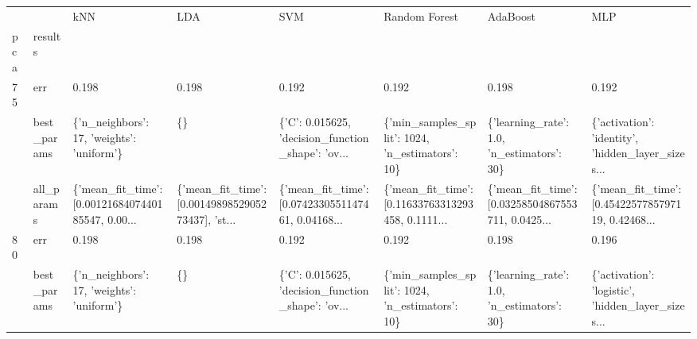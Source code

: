 \begin{tabular}{llllllll}
\toprule
    &            &                                                kNN &                                                LDA &                                                SVM &                                      Random Forest &                                           AdaBoost &                                                MLP \\
pca & results &                                                    &                                                    &                                                    &                                                    &                                                    &                                                    \\
\midrule
75  & err &                                              0.198 &                                              0.198 &                                              0.192 &                                              0.192 &                                              0.198 &                                              0.192 \\
    & best\_params &          \{'n\_neighbors': 17, 'weights': 'uniform'\} &                                                 \{\} &  \{'C': 0.015625, 'decision\_function\_shape': 'ov... &    \{'min\_samples\_split': 1024, 'n\_estimators': 10\} &         \{'learning\_rate': 1.0, 'n\_estimators': 30\} &  \{'activation': 'identity', 'hidden\_layer\_sizes... \\
    & all\_params &  \{'mean\_fit\_time': [0.0012168407440185547, 0.00... &  \{'mean\_fit\_time': [0.0014989852905273437], 'st... &  \{'mean\_fit\_time': [0.0742330551147461, 0.04168... &  \{'mean\_fit\_time': [0.11633763313293458, 0.1111... &  \{'mean\_fit\_time': [0.03258504867553711, 0.0425... &  \{'mean\_fit\_time': [0.4542257785797119, 0.42468... \\
80  & err &                                              0.198 &                                              0.198 &                                              0.192 &                                              0.192 &                                              0.198 &                                              0.196 \\
    & best\_params &          \{'n\_neighbors': 17, 'weights': 'uniform'\} &                                                 \{\} &  \{'C': 0.015625, 'decision\_function\_shape': 'ov... &    \{'min\_samples\_split': 1024, 'n\_estimators': 10\} &         \{'learning\_rate': 1.0, 'n\_estimators': 30\} &  \{'activation': 'logistic', 'hidden\_layer\_sizes... \\

\end{tabular}
